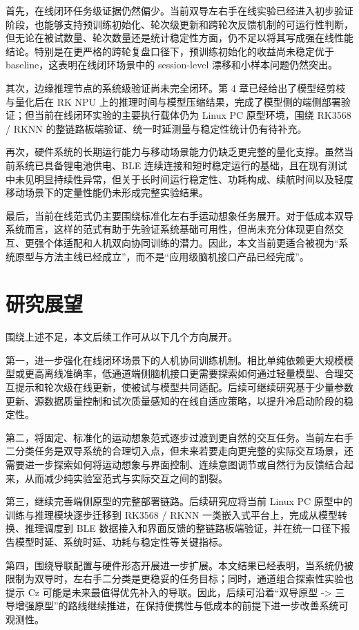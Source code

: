 首先，在线闭环任务级证据仍然偏少。当前双导左右手在线实验已经进入初步验证阶段，也能够支持预训练初始化、轮次级更新和跨轮次反馈机制的可运行性判断，但无论在被试数量、轮次数量还是统计稳定性方面，仍不足以将其写成强在线性能结论。特别是在更严格的跨轮复盘口径下，预训练初始化的收益尚未稳定优于 baseline，这表明在线闭环场景中的 session-level 漂移和小样本问题仍然突出。

其次，边缘推理节点的系统级验证尚未完全闭环。第 4 章已经给出了模型经剪枝与量化后在 RK NPU 上的推理时间与模型压缩结果，完成了模型侧的端侧部署验证；但当前在线闭环实验的主要执行载体仍为 Linux PC 原型环境，围绕 RK3568 / RKNN 的整链路板端验证、统一时延测量与稳定性统计仍有待补充。

再次，硬件系统的长期运行能力与移动场景能力仍缺乏更完整的量化支撑。虽然当前系统已具备锂电池供电、BLE 连续连接和短时稳定运行的基础，且在现有测试中未见明显持续性异常，但关于长时间运行稳定性、功耗构成、续航时间以及轻度移动场景下的定量性能仍未形成完整实验结果。

最后，当前在线范式仍主要围绕标准化左右手运动想象任务展开。对于低成本双导系统而言，这样的范式有助于先验证系统基础可用性，但尚未充分体现更自然交互、更强个体适配和人机双向协同训练的潜力。因此，本文当前更适合被视为“系统原型与方法主线已经成立”，而不是“应用级脑机接口产品已经完成”。

\section{研究展望}

围绕上述不足，本文后续工作可从以下几个方向展开。

第一，进一步强化在线闭环场景下的人机协同训练机制。相比单纯依赖更大规模模型或更高离线准确率，低通道端侧脑机接口更需要探索如何通过轻量模型、合理交互提示和轮次级在线更新，使被试与模型共同适配。后续可继续研究基于少量参数更新、源数据质量控制和试次质量感知的在线自适应策略，以提升冷启动阶段的稳定性。

第二，将固定、标准化的运动想象范式逐步过渡到更自然的交互任务。当前左右手二分类任务是双导系统的合理切入点，但未来若要走向更完整的实际交互场景，还需要进一步探索如何将运动想象与界面控制、连续意图调节或自然行为反馈结合起来，从而减少纯实验室范式与实际交互之间的割裂。

第三，继续完善端侧原型的完整部署链路。后续研究应将当前 Linux PC 原型中的训练与推理模块逐步迁移到 RK3568 / RKNN 一类嵌入式平台上，完成从模型转换、推理调度到 BLE 数据接入和界面反馈的整链路板端验证，并在统一口径下报告模型时延、系统时延、功耗与稳定性等关键指标。

第四，围绕导联配置与硬件形态开展进一步扩展。本文结果已经表明，当系统仍被限制为双导时，左右手二分类是更稳妥的任务目标；同时，通道组合探索性实验也提示 Cz 可能是未来最值得优先补入的导联。因此，后续可沿着“双导原型 -> 三导增强原型”的路线继续推进，在保持便携性与低成本的前提下进一步改善系统可观测性。

